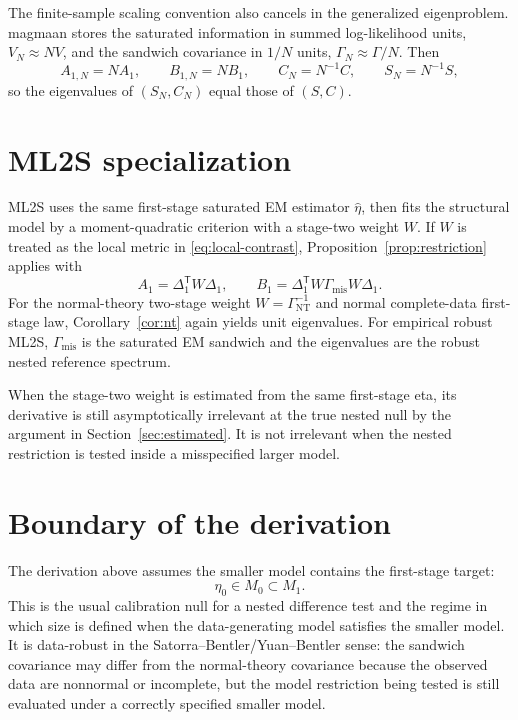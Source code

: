 \documentclass[11pt]{article}
\newcommand{\T}{^{\mathsf T}}
\theoremstyle{plain}
\theoremstyle{remark}
\begin{document}
The finite-sample scaling convention also cancels in the generalized
eigenproblem. magmaan stores the saturated information in summed
log-likelihood units, \(V_N\approx N V\), and the sandwich covariance in
\(1/N\) units, \(\Gamma_N\approx \Gamma/N\). Then
\[
  A_{1,N}=N A_1,\qquad B_{1,N}=N B_1,\qquad
  C_N=N^{-1}C,\qquad S_N=N^{-1}S,
\]
so the eigenvalues of \((S_N,C_N)\) equal those of \((S,C)\).

\section{ML2S specialization}
\label{sec:ml2s}

ML2S uses the same first-stage saturated EM estimator \(\hat\eta\), then fits
the structural model by a moment-quadratic criterion with a stage-two weight
\(W\). If \(W\) is treated as the local metric in
\eqref{eq:local-contrast}, Proposition~\ref{prop:restriction} applies with
\[
  A_1=\Delta_1\T W\Delta_1,
  \qquad
  B_1=\Delta_1\T W\Gamma_{\mathrm{mis}}W\Delta_1.
\]
For the normal-theory two-stage weight \(W=\Gamma_{\mathrm{NT}}^{-1}\) and
normal complete-data first-stage law, Corollary~\ref{cor:nt} again yields
unit eigenvalues. For empirical robust ML2S, \(\Gamma_{\mathrm{mis}}\) is the
saturated EM sandwich and the eigenvalues are the robust nested reference
spectrum.

When the stage-two weight is estimated from the same first-stage eta, its
derivative is still asymptotically irrelevant at the true nested null by the
argument in Section~\ref{sec:estimated}. It is not irrelevant when the nested
restriction is tested inside a misspecified larger model.

\section{Boundary of the derivation}
\label{sec:boundary}

The derivation above assumes the smaller model contains the first-stage target:
\[
  \eta_0\in M_0\subset M_1.
\]
This is the usual calibration null for a nested difference test and the regime
in which size is defined when the data-generating model satisfies the smaller
model. It is data-robust in the Satorra--Bentler/Yuan--Bentler sense: the
sandwich covariance may differ from the normal-theory covariance because the
observed data are nonnormal or incomplete, but the model restriction being
tested is still evaluated under a correctly specified smaller model.
\end{document}
